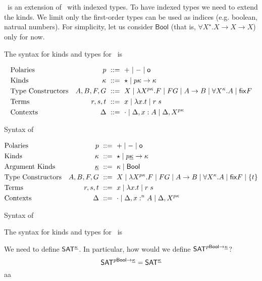 \section{\Fixi}
\Fixi\ is an extension of \Fixw\ with indexed types.
To have indexed types we need to extend the kinds.
We limit only the first-order types can be used as indices
(e.g. boolean, natrual numbers).
For simplicity, let us consider $\mathsf{Bool}$
(that is, $\forall X^\star.X\to X\to X$) only for now.

The syntax for kinds and types for \Fixw\ is
\begin{table}
\begin{align*}
&\text{Polaries}
	& p		&~ ::= ~ + \mid - \mid \textsf{o}
\\
&\text{Kinds}
	& \kappa	&~ ::= ~ \star \mid p\kappa \to \kappa
\\
&\text{Type Constructors}
	& A,B,F,G	&~ ::= ~ X
			\mid \lambda X^{p\kappa}.F
			\mid F G
			\mid A\to B
			\mid \forall X^\kappa . A
			\mid \mathsf{fix} F
\\
&\text{Terms}
	& r,s,t		&~ ::= ~ x \mid \lambda x.t \mid r\;s
\\
&\text{Contexts}
	& \Delta	&~ ::= ~ \cdot
			\mid \Delta, x:A
			\mid \Delta, X^{p\kappa}
\end{align*}
\caption{Syntax of \Fixw}
\label{tbl:syntaxFixw}
\end{table}


\begin{table}
\begin{align*}
&\text{Polaries}
	& p		&~ ::= ~ + \mid - \mid \textsf{o}
\\
&\text{Kinds}
 	& \kappa &~::=~ \star \mid  p\underline\kappa \to \kappa
\\
&\text{Argument Kinds}
	& \underline\kappa	&~ ::= ~ \kappa \mid \mathsf{Bool}
\\
&\text{Type Constructors}
	& A,B,F,G	&~ ::= ~ X
			\mid \lambda X^{p\kappa}.F
			\mid F G
			\mid A\to B
			\mid \forall X^\kappa . A
			\mid \mathsf{fix} F
			\mid \{t\}
\\
&\text{Terms}
	& r,s,t		&~ ::= ~ x \mid \lambda x.t \mid r\;s
\\
&\text{Contexts}
	& \Delta	&~ ::= ~ \cdot
			\mid \Delta, x :^n A
			\mid \Delta, X^{p\kappa}
\end{align*}
\caption{Syntax of \Fixi}
\label{tbl:syntaxFixi}
\end{table}

The syntax for kinds and types for \Fixi\ is



We need to define $\mathsf{SAT}^{\underline\kappa}$.
In particular, how would we define $\mathsf{SAT}^{p\mathsf{Bool}\to\underline\kappa}$?
\[ \mathsf{SAT}^{p\mathsf{Bool}\to\underline\kappa} = \mathsf{SAT}^{\underline\kappa} \]
aa

